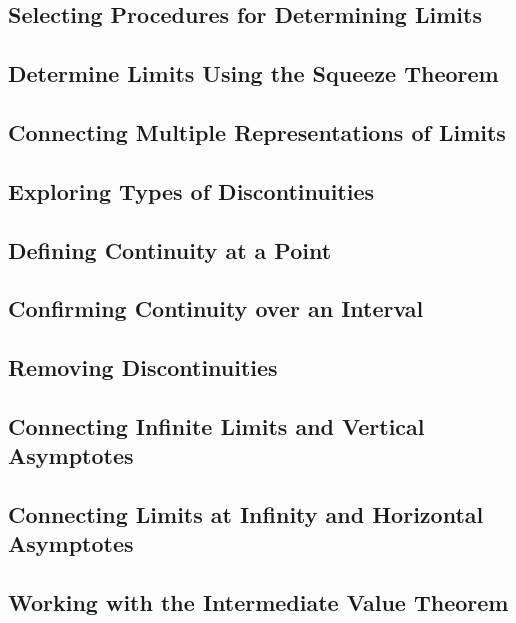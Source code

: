 \subsection{Selecting Procedures for Determining Limits}
\subsection{Determine Limits Using the Squeeze Theorem}
\subsection{Connecting Multiple Representations of Limits}
\subsection{Exploring Types of Discontinuities}
\subsection{Defining Continuity at a Point}
\subsection{Confirming Continuity over an Interval}
\subsection{Removing Discontinuities}
\subsection{Connecting Infinite Limits and Vertical Asymptotes}
\subsection{Connecting Limits at Infinity and Horizontal Asymptotes}
\subsection{Working with the Intermediate Value Theorem}




